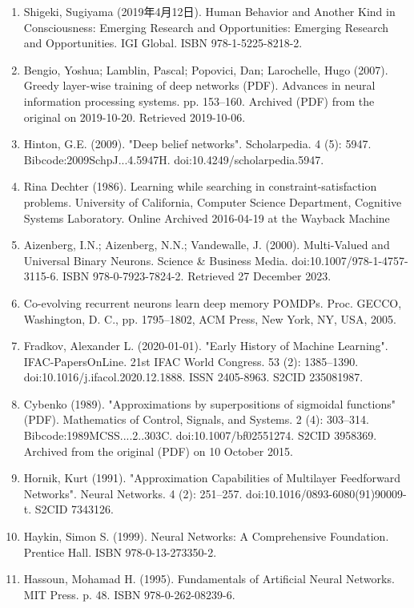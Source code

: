 \begin{enumerate}
\item Shigeki, Sugiyama (2019年4月12日). Human Behavior and Another Kind in Consciousness: Emerging Research and Opportunities: Emerging Research and Opportunities. IGI Global. ISBN 978-1-5225-8218-2.  
\item Bengio, Yoshua; Lamblin, Pascal; Popovici, Dan; Larochelle, Hugo (2007). Greedy layer-wise training of deep networks (PDF). Advances in neural information processing systems. pp. 153–160. Archived (PDF) from the original on 2019-10-20. Retrieved 2019-10-06.  
\item Hinton, G.E. (2009). "Deep belief networks". Scholarpedia. 4 (5): 5947. Bibcode:2009SchpJ...4.5947H. doi:10.4249/scholarpedia.5947.  
\item Rina Dechter (1986). Learning while searching in constraint-satisfaction problems. University of California, Computer Science Department, Cognitive Systems Laboratory. Online Archived 2016-04-19 at the Wayback Machine  
\item Aizenberg, I.N.; Aizenberg, N.N.; Vandewalle, J. (2000). Multi-Valued and Universal Binary Neurons. Science & Business Media. doi:10.1007/978-1-4757-3115-6. ISBN 978-0-7923-7824-2. Retrieved 27 December 2023.  
\item Co-evolving recurrent neurons learn deep memory POMDPs. Proc. GECCO, Washington, D. C., pp. 1795–1802, ACM Press, New York, NY, USA, 2005.  
\item Fradkov, Alexander L. (2020-01-01). "Early History of Machine Learning". IFAC-PapersOnLine. 21st IFAC World Congress. 53 (2): 1385–1390. doi:10.1016/j.ifacol.2020.12.1888. ISSN 2405-8963. S2CID 235081987.  
\item Cybenko (1989). "Approximations by superpositions of sigmoidal functions" (PDF). Mathematics of Control, Signals, and Systems. 2 (4): 303–314. Bibcode:1989MCSS....2..303C. doi:10.1007/bf02551274. S2CID 3958369. Archived from the original (PDF) on 10 October 2015.  
\item Hornik, Kurt (1991). "Approximation Capabilities of Multilayer Feedforward Networks". Neural Networks. 4 (2): 251–257. doi:10.1016/0893-6080(91)90009-t. S2CID 7343126.  
\item Haykin, Simon S. (1999). Neural Networks: A Comprehensive Foundation. Prentice Hall. ISBN 978-0-13-273350-2.  
\item Hassoun, Mohamad H. (1995). Fundamentals of Artificial Neural Networks. MIT Press. p. 48. ISBN 978-0-262-08239-6.  
\end{enumerate}